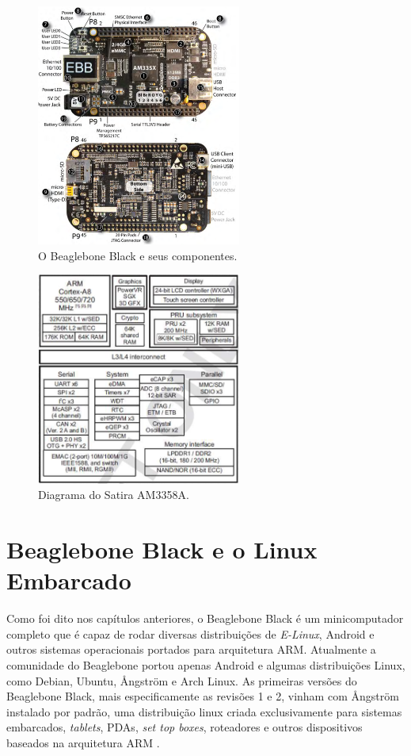 \begin{figure}
	\centering
	\includegraphics[width=0.6\textwidth]{figuras/bbb_componentes.png}
	\caption{O Beaglebone Black e seus componentes.\cite{derekbbb}}
	\label{figura:bbb_components}
\end{figure}

\begin{figure}
	\centering
	\includegraphics[width=0.6\textwidth]{figuras/bbb_soc.png}
	\caption{Diagrama do Satira AM3358A.\cite{bbbdatasheet}}
	\label{figura:bbb_soc}
\end{figure}

\section{Beaglebone Black e o Linux Embarcado}
\label{ch:bbb_elinux}

Como foi dito nos capítulos anteriores, o Beaglebone Black é um minicomputador completo que é capaz de rodar diversas distribuições de \emph{E-Linux}, Android e outros sistemas operacionais portados para arquitetura ARM. Atualmente a comunidade do Beaglebone portou apenas Android e algumas distribuições Linux, como Debian, Ubuntu, Ångström e Arch Linux. As primeiras versões do Beaglebone Black, mais especificamente as revisões 1 e 2, vinham com Ångström instalado por padrão, uma distribuição linux criada exclusivamente para sistemas embarcados, \emph{tablets}, PDAs, \emph{set top boxes}, roteadores e outros dispositivos baseados na arquitetura ARM \cite{sitebbbang}.

